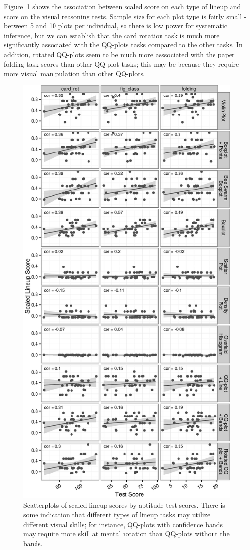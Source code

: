 \documentclass[11pt]{isuthesis}\usepackage[]{graphicx}\usepackage[]{color}
\begin{document}
Figure~\ref{fig:scatterplottypes} shows the association between scaled score on each type of lineup and score on the visual reasoning tests. Sample size for each plot type is fairly small - between 5 and 10 plots per individual, so there is low power for systematic inference, but we can establish that the card rotation task is much more significantly associated with the QQ-plots tasks compared to the other tasks. In addition, rotated QQ-plots seem to be much more asssociated with the paper folding task scores than other QQ-plot tasks; this may be because they require more visual manipulation than other QQ-plots.



\begin{figure}[ht]\centering
\includegraphics[width=.5\linewidth]{fig-lineup-types-scores-1}
\caption{Scatterplots of scaled lineup scores by aptitude test scores. There is some indication that different types of lineup tasks may utilize different visual skills; for instance, QQ-plots with confidence bands may require more skill at mental rotation than QQ-plots without the bands. \label{fig:scatterplottypes}}
\end{figure}
\end{document}
